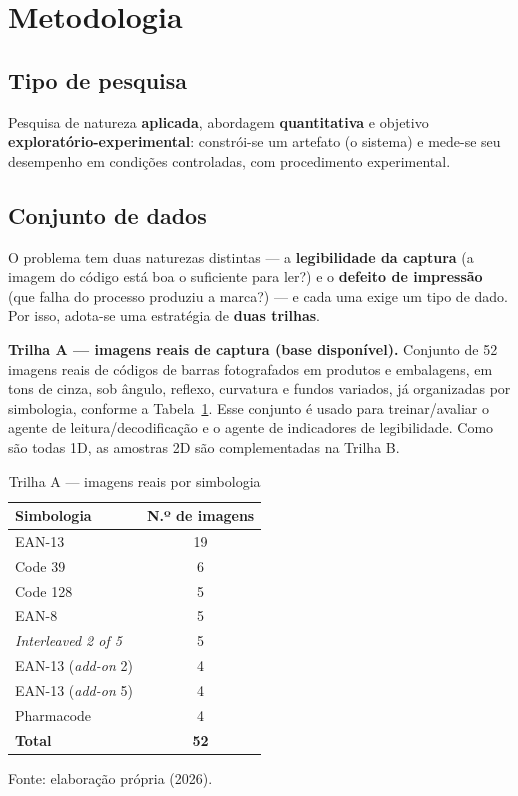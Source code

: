 \documentclass[
	article,			%
	11pt,				%
	oneside,			%
	a4paper,			%
	english,			%
	brazilian,			%
	sumario=tradicional
	]{abntex2}
\begin{document}
\section{Metodologia}\label{sec-metodo}

\subsection{Tipo de pesquisa}

Pesquisa de natureza \textbf{aplicada}, abordagem \textbf{quantitativa} e objetivo
\textbf{exploratório-experimental}: constrói-se um artefato (o sistema) e mede-se
seu desempenho em condições controladas, com procedimento experimental.

\subsection{Conjunto de dados}\label{sec-dados}

O problema tem duas naturezas distintas --- a \textbf{legibilidade da captura} (a
imagem do código está boa o suficiente para ler?) e o \textbf{defeito de
impressão} (que falha do processo produziu a marca?) --- e cada uma exige um tipo
de dado. Por isso, adota-se uma estratégia de \textbf{duas trilhas}.

\noindent\textbf{Trilha A --- imagens reais de captura (base disponível).}
Conjunto de 52 imagens reais de códigos de barras fotografados em produtos e
embalagens, em tons de cinza, sob ângulo, reflexo, curvatura e fundos variados, já
organizadas por simbologia, conforme a Tabela~\ref{tab-trilhaA}. Esse conjunto é
usado para treinar/avaliar o agente de leitura/decodificação e o agente de
indicadores de legibilidade. Como são todas 1D, as amostras 2D são complementadas
na Trilha B.

\begin{table}[htb]
\centering
\caption{Trilha A --- imagens reais por simbologia}
\label{tab-trilhaA}
\begin{tabular}{@{}lc@{}}
\toprule
\textbf{Simbologia} & \textbf{N.º de imagens}\\
\midrule
EAN-13 & 19\\
Code 39 & 6\\
Code 128 & 5\\
EAN-8 & 5\\
\textit{Interleaved 2 of 5} & 5\\
EAN-13 (\textit{add-on} 2) & 4\\
EAN-13 (\textit{add-on} 5) & 4\\
Pharmacode & 4\\
\midrule
\textbf{Total} & \textbf{52}\\
\bottomrule
\end{tabular}

\vspace{2pt}
{\footnotesize Fonte: elaboração própria (2026).}
\end{table}
\end{document}
